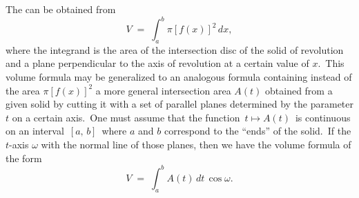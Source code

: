 \documentclass[12pt]{article}
\theoremstyle{definition}
\begin{document}
 
The  can be obtained from
                $$V \;=\; \int_a^b\pi[f(x)]^2\,dx,$$
where the integrand is the area of the intersection disc of the solid of revolution and a plane perpendicular to the axis of revolution at a certain value of $x$.\, This volume formula may be generalized to an analogous formula containing instead of the area $\pi[f(x)]^2$ a more general intersection area $A(t)$ obtained from a given solid by cutting it with a set of parallel planes determined by the parameter $t$ on a certain axis.\, One must assume that the function \,$t \mapsto A(t)$\, is continuous on an interval \,$[a,\,b]$\, where $a$ and $b$ correspond to the ``ends'' of the solid.\, If the $t$-axis  $\omega$ with the normal line of those planes, then we have the volume formula of the form
      $$V \;=\; \int_a^b\!A(t)\,dt\,\cos\omega.$$


\end{document}
